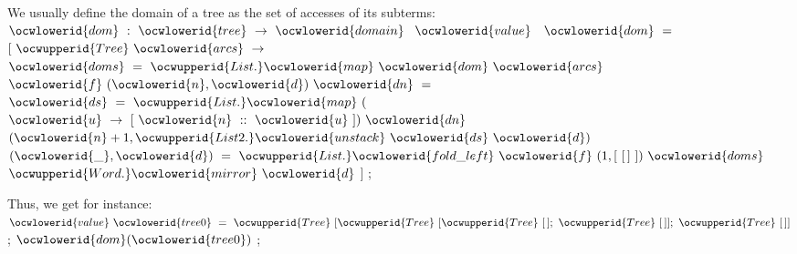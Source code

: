 \documentclass[12pt]{article}
\begin{document}
\ocwendcode{}\ocwindent{0.00em}
We usually define the domain of a tree as the set of accesses of its subterms: 
\ocweol
\ocwindent{0.00em}
\ocwbegindcode{}~$\ocwlowerid{dom}~:~\ocwlowerid{tree}~\rightarrow{}~\ocwlowerid{domain}~$\ocwenddcode{} 
\ocweol
\label{../ML/zipper.ml:1292}%
\medskip
\ocwbegincode{}\ocwindent{0.00em}
$\ocwlowerid{value}~$~$\ocwlowerid{dom}~=~$\ocweol
\ocwindent{1.00em}
$[~\ocwupperid{Tree}~\ocwlowerid{arcs}~\rightarrow{}~$\ocweol
\ocwindent{2.00em}
~$\ocwlowerid{doms}~=~\ocwupperid{List.}\ocwlowerid{map}~\ocwlowerid{dom}~\ocwlowerid{arcs}~$\ocweol
\ocwindent{2.00em}
~$\ocwlowerid{f}~(\ocwlowerid{n},\ocwlowerid{d})~\ocwlowerid{dn}~=~$~$\ocwlowerid{ds}~=~\ocwupperid{List.}\ocwlowerid{map}~($~$\ocwlowerid{u}~\rightarrow{}~[~\ocwlowerid{n}~::~\ocwlowerid{u}~])~\ocwlowerid{dn}~$\ocweol
\ocwindent{10.50em}
~$(\ocwlowerid{n}+1,\ocwupperid{List2.}\ocwlowerid{unstack}~\ocwlowerid{ds}~\ocwlowerid{d})~$\ocweol
\ocwindent{2.00em}
~$(\ocwlowerid{\_},\ocwlowerid{d})~=~\ocwupperid{List.}\ocwlowerid{fold\_left}~\ocwlowerid{f}~(1,[~[\,]~])~\ocwlowerid{doms}~$~$\ocwupperid{Word.}\ocwlowerid{mirror}~\ocwlowerid{d}$\ocweol
\ocwindent{1.00em}
$]$\ocweol
\ocwindent{0.00em}
;\medskip

\ocwendcode{}\ocwindent{0.00em}
Thus, we get for instance: 
\ocweol
\label{../ML/zipper.ml:1590}%
\medskip
\ocwbegincode{}\ocwindent{0.00em}
$\ocwlowerid{value}~\ocwlowerid{tree0}~=~\ocwupperid{Tree}~[\ocwupperid{Tree}~[\ocwupperid{Tree}~[\,];~\ocwupperid{Tree}~[\,]];~\ocwupperid{Tree}~[\,]]$\ocweol
\ocwindent{0.00em}
;\ocweol
\ocwindent{0.00em}
$\ocwlowerid{dom}(\ocwlowerid{tree0})$\ocweol
\ocwindent{0.00em}
;\medskip
\end{document}
